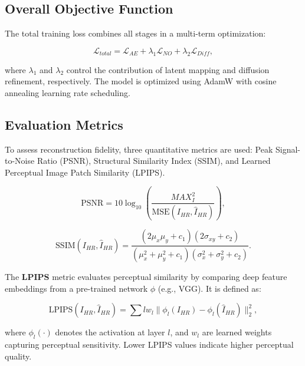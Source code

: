 \documentclass[conference]{IEEEtran}
\begin{document}
\subsection{Overall Objective Function}
The total training loss combines all stages in a multi-term optimization:

\begin{equation}
\mathcal{L}_{total} = \mathcal{L}_{AE} + \lambda_1 \mathcal{L}_{NO} + \lambda_2 \mathcal{L}_{Diff},
\end{equation}

where $\lambda_1$ and $\lambda_2$ control the contribution of latent mapping and diffusion refinement, respectively. 
The model is optimized using AdamW with cosine annealing learning rate scheduling.


\subsection{Evaluation Metrics}
To assess reconstruction fidelity, three quantitative metrics are used: Peak Signal-to-Noise Ratio (PSNR), Structural Similarity Index (SSIM), and Learned Perceptual Image Patch Similarity (LPIPS).

\begin{equation}
\text{PSNR} = 10 \log_{10} \left( \frac{MAX_I^2}{\text{MSE}(I_{HR}, \hat{I}_{HR})} \right),
\end{equation}

\begin{equation}
\text{SSIM}(I_{HR}, \hat{I}_{HR}) = \frac{(2\mu_x\mu_y + c_1)(2\sigma_{xy} + c_2)}{(\mu_x^2 + \mu_y^2 + c_1)(\sigma_x^2 + \sigma_y^2 + c_2)}.
\end{equation}

The \textbf{LPIPS} metric \cite{zhang2018unreasonable} evaluates perceptual similarity by comparing deep feature embeddings from a pre-trained network $\phi$ (e.g., VGG). It is defined as:

\begin{equation}
\text{LPIPS}(I_{HR}, \hat{I}_{HR}) = \sum{l} w_l \| \phi_l(I_{HR}) - \phi_l(\hat{I}_{HR}) \|_2^2,
\end{equation}

where $\phi_l(\cdot)$ denotes the activation at layer $l$, and $w_l$ are learned weights capturing perceptual sensitivity. Lower LPIPS values indicate higher perceptual quality.
\end{document}
